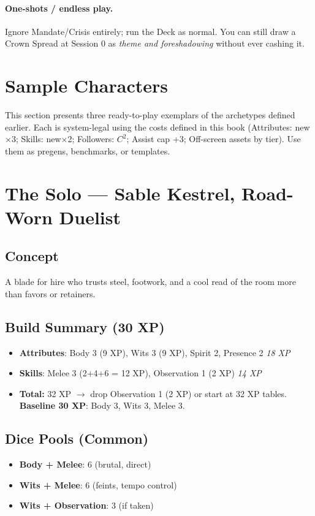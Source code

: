 \documentclass[12pt]{book}
\begin{document}
\paragraph{One-shots / endless play.} Ignore Mandate/Crisis entirely; run the Deck as normal. You can still draw a Crown Spread at Session 0 as \emph{theme and foreshadowing} without ever cashing it.


\appendix

\section{Sample Characters}

This section presents three ready-to-play exemplars of the archetypes defined earlier. Each is system-legal using the costs defined in this book (Attributes: new$\times$3; Skills: new$\times$2; Followers: $C^2$; Assist cap +3; Off-screen assets by tier). Use them as pregens, benchmarks, or templates.

\section{The Solo — Sable Kestrel, Road-Worn Duelist}

\subsection*{Concept}
A blade for hire who trusts steel, footwork, and a cool read of the room more than favors or retainers.

\subsection*{Build Summary (30 XP)}
\begin{itemize}
  \item \textbf{Attributes}: Body 3 (9 XP), Wits 3 (9 XP), Spirit 2, Presence 2 \hfill \emph{18 XP}
  \item \textbf{Skills}: Melee 3 (2+4+6 = 12 XP), Observation 1 (2 XP) \hfill \emph{14 XP}
  \item \textbf{Total:} 32 XP $\rightarrow$ drop Observation 1 (2 XP) or start at 32 XP tables. \textbf{Baseline 30 XP}: Body 3, Wits 3, Melee 3.
\end{itemize}

\subsection*{Dice Pools (Common)}
\begin{itemize}
  \item \textbf{Body + Melee}: 6 (brutal, direct)
  \item \textbf{Wits + Melee}: 6 (feints, tempo control)
  \item \textbf{Wits + Observation}: 3 (if taken)
\end{itemize}
\end{document}
